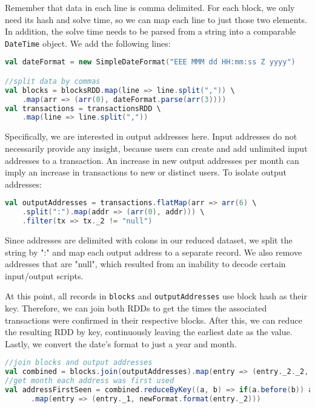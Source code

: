 \documentclass[9pt,twocolumn,twoside]{idsi}
\begin{document}
Remember that data in each line is comma delimited. For each block, we only need its hash and solve time, so we can map each line to just those two elements. In addition, the solve time needs to be parsed from a string into a comparable \lstinline{DateTime} object. We add the following lines:

\begin{lstlisting}[language=Scala]
val dateFormat = new SimpleDateFormat("EEE MMM dd HH:mm:ss Z yyyy")

//split data by commas
val blocks = blocksRDD.map(line => line.split(",")) \
    .map(arr => (arr(0), dateFormat.parse(arr(3))))
val transactions = transactionsRDD \
    .map(line => line.split(","))
\end{lstlisting}

Specifically, we are interested in output addresses here. Input addresses do not necessarily provide any insight, because users can create and add unlimited input addresses to a transaction. An increase in new output addresses per month can imply an increase in transactions to new or distinct users. To isolate output addresses:

\begin{lstlisting}[language=Scala]
val outputAddresses = transactions.flatMap(arr => arr(6) \
    .split(":").map(addr => (arr(0), addr))) \
    .filter(tx => tx._2 != "null")
\end{lstlisting}

Since addresses are delimited with colons in our reduced dataset, we split the string by ":" and map each output address to a separate record. We also remove addresses that are "null", which resulted from an inability to decode certain input/output scripts.

At this point, all records in \lstinline{blocks} and \lstinline{outputAddresses} use block hash as their key. Therefore, we can join both RDDs to get the times the associated transactions were confirmed in their respective blocks. After this, we can reduce the resulting RDD by key, continuously leaving the earliest date as the value. Lastly, we convert the date's format to just a year and month.

\begin{lstlisting}[language=Scala]
//join blocks and output addresses
val combined = blocks.join(outputAddresses).map(entry => (entry._2._2, entry._2._1))
//get month each address was first used
val addressFirstSeen = combined.reduceByKey((a, b) => if(a.before(b)) a else b) \
      .map(entry => (entry._1, newFormat.format(entry._2)))
\end{lstlisting}
\end{document}
